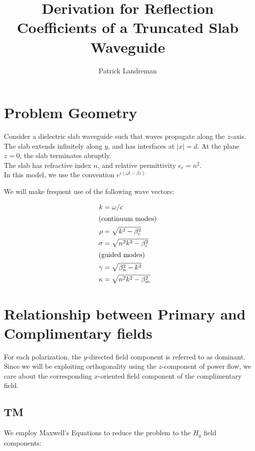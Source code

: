 \documentclass[11pt, oneside]{article}   	%
\title{Derivation for Reflection Coefficients of a Truncated Slab Waveguide}
\author{Patrick Landreman}
\begin{document}
\lstset{language=Python, frame=single, breaklines=true}
\maketitle
\section{Problem Geometry}

Consider a dielectric slab waveguide such that waves propagate along the $z$-axis. The slab extends infinitely along $y$, and has interfaces at $|x| = d$. At the plane $z=0$, the slab terminates abruptly.\\

\noindent The slab has refractive index $n$, and relative permittivity $\epsilon_{r} = n^{2}$.\\

\noindent In this model, we use the convention $e^{i(\omega t - \beta z)}$

\noindent We will make frequent use of the following wave vectors:

\begin{align}
k &= \omega / c \nonumber \\
\intertext{(continuum modes)}
\rho &= \sqrt{k^{2} - \beta^{2}_{c}} \nonumber \\
\sigma &= \sqrt{n^{2} k^{2} - \beta^{2}_{c}} \nonumber \\
\intertext{(guided modes)}
\gamma &= \sqrt{\beta^{2}_{n}-k^{2}} \nonumber \\
\kappa &= \sqrt{n^{2} k^{2} - \beta^{2}_{m}} \nonumber
\end{align}

\section{Relationship between Primary and Complimentary fields}

For each polarization, the $y$-directed field component is referred to as dominant. Since we will be exploiting orthogonality using the $z$-component of power flow, we care about the corresponding $x$-oriented field component of the complimentary field.

\subsection{TM}

\noindent We employ Maxwell's Equations to reduce the problem to the $H_{y}$ field components:
\end{document}
